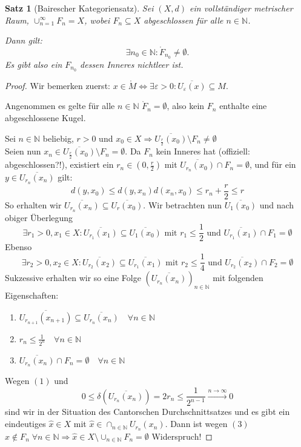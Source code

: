 \documentclass[ngerman]{report}
\theoremstyle{plain}%
\newtheorem{thm}{Satz}[chapter]
\theoremstyle{definition}%
\theoremstyle{myStyle}
\newcommand{\N}{\mathbb{N}}
\newcommand{\df}[1][]{%
	\overset{#1}{\Rightarrow}
}
\begin{document}
\begin{thm}[Bairescher Kategoriensatz]
	Sei $(X,d)$ ein vollständiger metrischer Raum, $\cup^\infty_{n=1} F_n = X$, wobei $F_n \subseteq X$ abgeschlossen für alle $n\in\N$.\par
	Dann gilt: $$\exists n_0\in\N:\mathring F_{n_0} \not = \emptyset.$$ Es gibt also ein $F_{n_0}$ dessen Inneres nichtleer ist.
\end{thm}
\begin{proof}
	Wir bemerken zuerst: $x\in\mathring M \Leftrightarrow \exists \varepsilon >0: \overline{U_\varepsilon (x)} \subseteq M$.\par 
	Angenommen es gelte für alle $n\in\N$ $\mathring F_n = \emptyset$, also kein $F_n$ enthalte eine abgeschlossene Kugel.\par 
	Sei $n\in\N$ beliebig, $r>0$ und $x_0\in X \df \overline{U_{\frac{r}{2}}(x_0)}\setminus F_n \not = \emptyset $\\
	Seien nun $x_n \in \overline{U_{\frac{r}{2}}(x_0)}\setminus F_n = \emptyset$. 	
	Da $F_n$ kein Inneres hat (offiziell: abgeschlossen?!), existiert ein $r_n \in (0,\frac{r}{2})$ mit $\overline{U_{r_n}(x_0)}\cap F_n = \emptyset$, 
	und für ein $y\in \overline{U_{r_n}(x_n)}$ gilt:
	$$d(y,x_0) \leq d(y,x_n) d(x_n, x_0) \leq r_n + \frac{r}{2} \leq r $$
	So erhalten wir $\overline{U_{r_n}(x_n)} \subseteq \overline{U_r(x_0)}$.
	Wir betrachten nun $\overline{U_1(x_0)}$ und nach obiger Überlegung
	$$\exists r_1 > 0, x_1 \in X: \overline{U_{r_1} (x_1)} \subseteq \overline{U_1(x_0)} \text{ mit } r_1 \leq \frac{1}{2} \text{ und } \overline{U_{r_1}(x_1)} \cap F_1 = \emptyset$$
	Ebenso
	$$\exists r_2 > 0, x_2 \in X: \overline{U_{r_2} (x_2)} \subseteq \overline{U_{r_1}(x_1)} \text{ mit } r_2 \leq \frac{1}{4} \text{ und } \overline{U_{r_2}(x_2)} \cap F_2 = \emptyset$$
	Sukzessive erhalten wir so eine Folge $\left( \overline{U_{r_n}(x_n)}\right)_{n\in\N}$ mit folgenden Eigenschaften:
	\begin{enumerate}[(1)]
		\item $\overline{U_{r_{n+1}} (x_{n+1})} \subseteq \overline{U_{r_n}(x_n)} \quad \forall n\in\N$
		
		\item $r_n \leq \frac{1}{2^n}\quad \forall n\in\N$
		
		\item $\overline{U_{r_n}(x_n)} \cap F_n = \emptyset\quad \forall n\in\N$
	\end{enumerate}
	Wegen $(1)$ und $$0 \leq \delta\left(\overline{U_{r_n}(x_n)}\right) = 2r_n \leq \frac{1}{2^{n-1}}\overset{n\to\infty}{\longrightarrow}0$$
	sind wir in der Situation des Cantorschen Durchschnittsatzes und es gibt ein eindeutiges $\hat{x} \in X$ mit $\hat{x}\in \cap_{n\in\N} U_{r_n}(x_n)$.
	Dann ist wegen $(3)$ $\hat{x} \not \in F_n\; \forall n\in\N \df \hat{x}\in X \setminus \cup_{n\in\N} F_n = \emptyset$ Widerspruch!
\end{proof}
\end{document}
